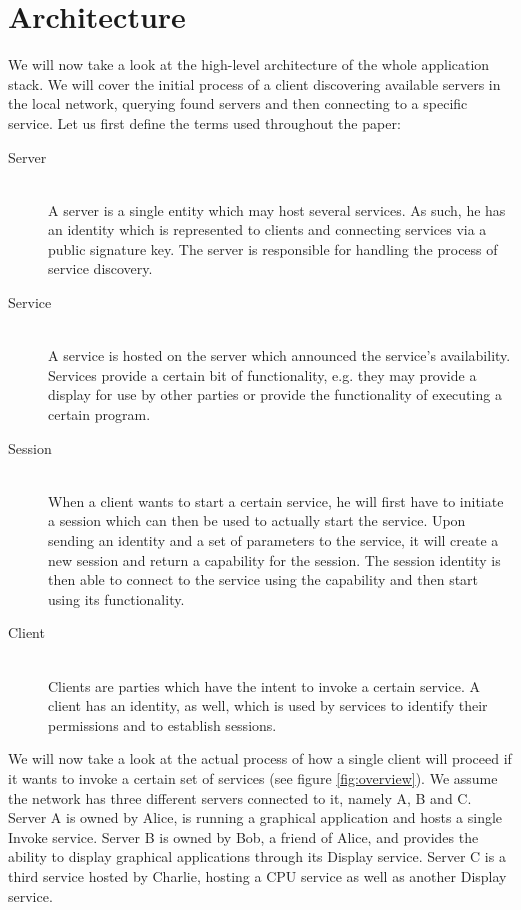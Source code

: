 \chapter{Architecture}
\label{sec:architecture}

We will now take a look at the high-level architecture of the whole application stack.
We will cover the initial process of a client discovering available servers in the local network, querying found servers and then connecting to a specific service.
Let us first define the terms used throughout the paper:
\begin{description}
    \item[Server]\hfill\\
        A server is a single entity which may host several services.
        As such, he has an identity which is represented to clients and connecting services via a public signature key.
        The server is responsible for handling the process of service discovery.
    \item[Service]\hfill\\
        A service is hosted on the server which announced the service's availability.
        Services provide a certain bit of functionality, e.g. they may provide a display for use by other parties or provide the functionality of executing a certain program.
    \item[Session]\hfill\\
        When a client wants to start a certain service, he will first have to initiate a session which can then be used to actually start the service.
        Upon sending an identity and a set of parameters to the service, it will create a new session and return a capability for the session.
        The session identity is then able to connect to the service using the capability and then start using its functionality.
    \item[Client]\hfill\\
        Clients are parties which have the intent to invoke a certain service.
        A client has an identity, as well, which is used by services to identify their permissions and to establish sessions.
\end{description}

We will now take a look at the actual process of how a single client will proceed if it wants to invoke a certain set of services (see figure \ref{fig:overview}).
We assume the network has three different servers connected to it, namely A, B and C.
Server A is owned by Alice, is running a graphical application and hosts a single Invoke service.
Server B is owned by Bob, a friend of Alice, and provides the ability to display graphical applications through its Display service.
Server C is a third service hosted by Charlie, hosting a CPU service as well as another Display service.

